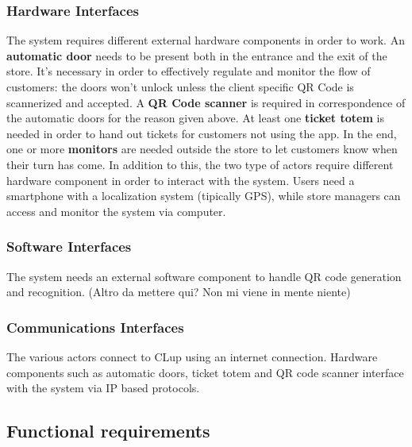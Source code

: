 \documentclass[]{article}
\begin{document}
		
			\subsubsection{Hardware Interfaces}
			The system requires different external hardware components in order to work. \newline
			An \textbf{automatic door} needs to be present both in the entrance and the exit of the store. It's necessary in order to effectively regulate and monitor the flow of customers: the doors won't unlock unless the client specific QR Code is scannerized and accepted. \newline
			A \textbf{QR Code scanner} is required in correspondence of the automatic doors for the reason given above. \newline
			At least one \textbf{ticket totem} is needed in order to hand out tickets for customers not using the app. \newline
			In the end, one or more \textbf{monitors} are needed outside the store to let customers know when their turn has come. \newline \newline
			In addition to this, the  two type of actors require different hardware component in order to interact with the system. \newline
			Users need a smartphone with a localization system (tipically GPS), while store managers can access and monitor the system via computer.
			\subsubsection{Software Interfaces}
			The system needs an external software component to handle QR code generation and recognition. \newline (Altro da mettere qui? Non mi viene in mente niente)
			\subsubsection{Communications Interfaces}
			The various actors connect to CLup using an internet connection. \newline
			Hardware components such as automatic doors, ticket totem and QR code scanner interface with the system via IP based protocols.
		
		
		\subsection{Functional requirements}
			
\end{document}
